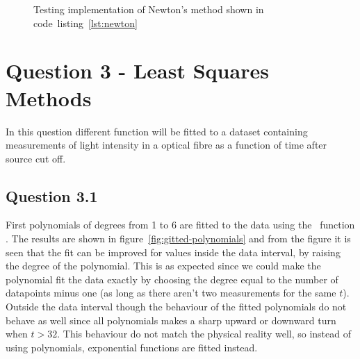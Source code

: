\begin{figure}
    \caption{Testing implementation of Newton's method shown in code~listing~\ref{lst:newton}}
    \label{fig:newton-test}
\end{figure}

\section*{Question 3 - Least Squares Methods}
In this question different function will be fitted to a dataset containing measurements of light intensity in a optical fibre as a function of time after source cut off.

\subsection*{Question 3.1}
First polynomials of degrees from 1 to 6 are fitted to the data using the \matlab\ function . The results are shown in figure~\ref{fig:gitted-polynomials} and from the figure it is seen that the fit can be improved for values inside the data interval, by raising the degree of the polynomial. This is as expected since we could make the polynomial fit the data exactly by choosing the degree equal to the number of datapoints minus one (as long as there aren't two measurements for the same $t$). Outside the data interval though the behaviour of the fitted polynomials do not behave as well since all polynomials makes a sharp upward or downward turn when $t>32$. This behaviour do not match the physical reality well, so instead of using polynomials, exponential functions are fitted instead.
